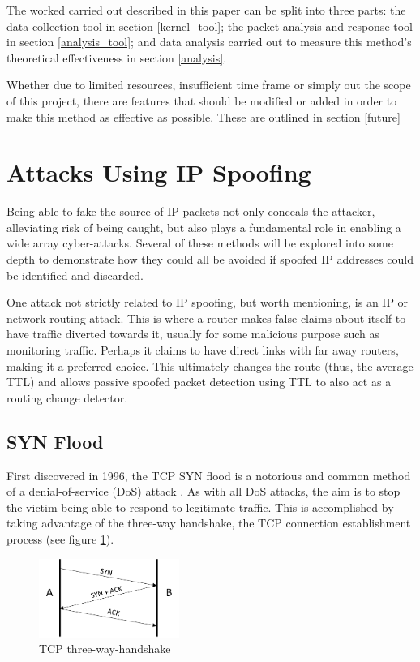 \documentclass[12pt,twoside]{article}
\begin{document}
The worked carried out described in this paper can be split into three parts: the data collection tool in section \ref{kernel_tool}; the packet analysis and response tool in section \ref{analysis_tool}; and data analysis carried out to measure this method's theoretical effectiveness in section \ref{analysis}.

Whether due to limited resources, insufficient time frame or simply out the scope of this project, there are features that should be modified or added in order to make this method as effective as possible. These are outlined in section \ref{future}
\section{Attacks Using IP Spoofing} \label{attacks}

Being able to fake the source of IP packets not only conceals the attacker, alleviating risk of being caught, but also plays a fundamental role in enabling a wide array cyber-attacks. Several of these methods will be explored into some depth to demonstrate how they could all be avoided if spoofed IP addresses could be identified and discarded.

One attack not strictly related to IP spoofing, but worth mentioning, is an IP or network routing attack. This is where a router makes false claims about itself to have traffic diverted towards it, usually for some malicious purpose such as monitoring traffic. Perhaps it claims to have direct links with far away routers, making it a preferred choice. This ultimately changes the route (thus, the average TTL) and allows passive spoofed packet detection using TTL to also act as a routing change detector. 

\subsection{SYN Flood}
First discovered in 1996, the TCP SYN flood is a notorious and common method of a denial-of-service (DoS) attack \cite{rfc4987}. As with all DoS attacks, the aim is to stop the victim being able to respond to legitimate traffic. This is accomplished by taking advantage of the three-way handshake, the TCP connection establishment process (see figure \ref{figure_handshake}).

\begin{figure}[h]
	\begin{center}
		\includegraphics[width=4.57cm, height=2.57cm]{figures/three-way-handshake}
	\end{center}
	\caption{TCP three-way-handshake}
	\label{figure_handshake} 
\end{figure}
\end{document}
